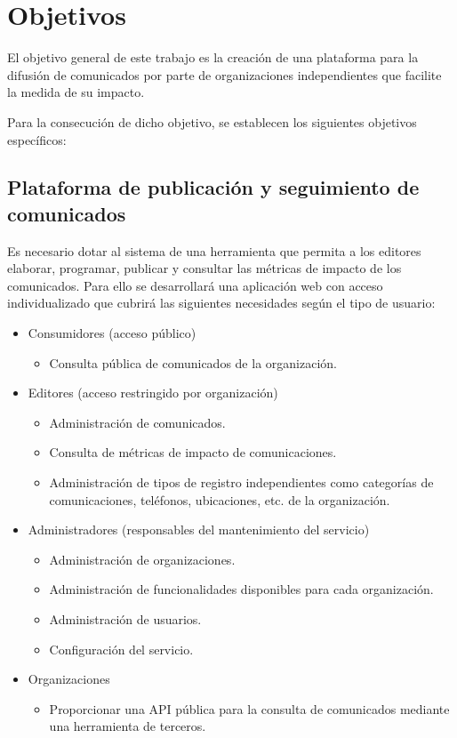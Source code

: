 \chapter{Objetivos}
El objetivo general de este trabajo es la creación de una plataforma para la difusión de comunicados por parte de organizaciones independientes que facilite la medida de su impacto.

Para la consecución de dicho objetivo, se establecen los siguientes objetivos específicos:

\section{Plataforma de publicación y seguimiento de comunicados}
Es necesario dotar al sistema de una herramienta que permita a los editores elaborar, programar, publicar y consultar las métricas de impacto de los comunicados. Para ello se desarrollará una aplicación web con acceso individualizado que cubrirá las siguientes necesidades según el tipo de usuario:
\begin{itemize}
    \item Consumidores (acceso público)
    \begin{itemize}
        \item Consulta pública de comunicados de la organización.
    \end{itemize}
    \item Editores (acceso restringido por organización)
    \begin{itemize}
        \item Administración de comunicados.
        \item Consulta de métricas de impacto de comunicaciones.
        \item Administración de tipos de registro independientes como categorías de comunicaciones, teléfonos, ubicaciones, etc. de la organización.
    \end{itemize}
    \item Administradores (responsables del mantenimiento del servicio)
    \begin{itemize}
        \item Administración de organizaciones.
        \item Administración de funcionalidades disponibles para cada organización.
        \item Administración de usuarios.
        \item Configuración del servicio.
    \end{itemize}
    \item Organizaciones
    \begin{itemize}
        \item Proporcionar una API pública para la consulta de comunicados mediante una herramienta de terceros.
    \end{itemize}
\end{itemize}

